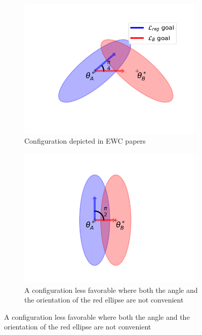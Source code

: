 \documentclass[11pt]{article}
\begin{document}
\begin{figure}
    \centering
    \begin{subfigure}[b]{0.3\textwidth}
        \centering
        \includegraphics[width=0.99\textwidth]{images/ellipse_overlap_45.png}
        \caption{Configuration depicted in EWC papers}
        \label{fig:two_ellipses_45}
    \end{subfigure}
    \hspace{-0mm}
    \begin{subfigure}[b]{0.3\textwidth}
        \centering
        \includegraphics[width=0.99\textwidth]{images/ellipse_overlap_90.png}
        \caption{A configuration less favorable where both the angle and the orientation of the red ellipse are not convenient}

\end{subfigure}
\end{figure}
\end{document}
